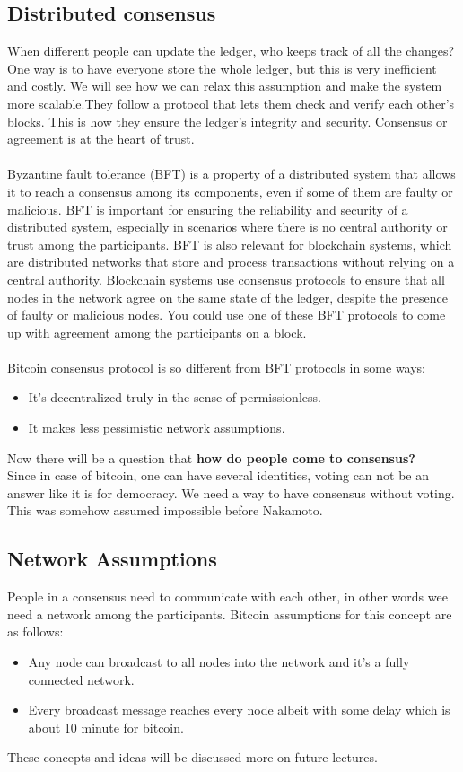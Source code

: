 \subsection{Distributed consensus}
 When different people can update the ledger, who keeps track of all the changes? One way is to have everyone store the whole ledger, but this is very inefficient and costly. We will see how we can relax this assumption and make the system more scalable.They follow a protocol that lets them check and verify each other’s blocks. This is how they ensure the ledger’s integrity and security. Consensus or agreement is at the heart of trust.\\\\
Byzantine fault tolerance (BFT) is a property of a distributed system that allows it to reach a consensus among its components, even if some of them are faulty or malicious. BFT is important for ensuring the reliability and security of a distributed system, especially in scenarios where there is no central authority or trust among the participants. BFT is also relevant for blockchain systems, which are distributed networks that store and process transactions without relying on a central authority. Blockchain systems use consensus protocols to ensure that all nodes in the network agree on the same state of the ledger, despite the presence of faulty or malicious nodes.  You could use one of these BFT protocols to come up with agreement among the participants on a block.\\\\
Bitcoin consensus protocol is so different from BFT protocols in some ways:
\begin{itemize}
	\item It's decentralized truly in the sense of permissionless.
	\item It makes less pessimistic network assumptions.
\end{itemize}
Now there will be a question that  \textbf{how do people come to consensus?}\\
Since in case of bitcoin, one can have several identities,  voting can not be an answer like it is for democracy. We  need a way to have consensus without voting. This was somehow assumed impossible before Nakamoto.

\subsection{Network Assumptions}
People in a consensus need to communicate with each other, in other words wee need a network among the participants.
Bitcoin assumptions for this concept are as follows:
\begin{itemize}
	\item Any node can broadcast to all nodes into the network and it's a fully connected network.
	\item Every broadcast message reaches every node albeit with some delay which is about 10 minute for bitcoin. 
\end{itemize}
These concepts and ideas will be discussed more on future lectures.

